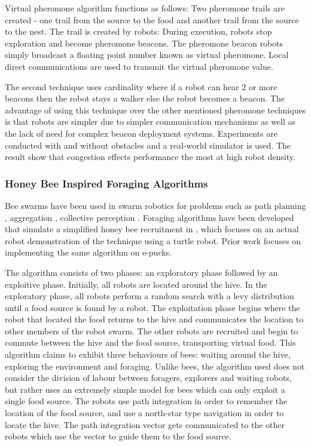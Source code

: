 Virtual pheromone algorithm functions as follows: Two pheromone trails are created - one trail from the source to the food and another trail from the source to the nest. The trail is created by robots: During execution, robots stop exploration and become pheromone beacons. The pheromone beacon robots simply broadcast a floating point number known as virtual pheromone. 
Local direct communications are used to transmit the virtual pheromone value.

The second technique uses cardinality where if a robot can hear 2 or more beacons then the robot stays a walker else the robot becomes a beacon. The advantage of using this technique over the other mentioned pheromone techniques is that robots are simpler due to simpler communication mechanisms as well as the lack of need for complex beacon deployment systems. Experiments are conducted with and without obstacles and a real-world simulator is used. The result show that congestion effects performance the most at high robot density. 

\subsubsection{Honey Bee Inspired Foraging Algorithms}
Bee swarms have been used in swarm robotics for problems such as path planning \cite{lin2009chaotic}, aggregation \cite{kernbach2009re}, collective perception \cite{schmickl2007collective}. Foraging algorithms have been developed that simulate a simplified honey bee recruitment in \cite{alers2014biologically}, which focuses on an actual robot demonstration of the technique using a turtle robot. Prior work focuses on implementing the same algorithm on e-pucks. 

The algorithm consists of two phases: an exploratory phase followed by an exploitive phase. Initially, all robots are located around the hive. In the exploratory phase, all robots perform a random search with a levy distribution until a food source is found by a robot. The exploitation phase begins where the robot that located the food returns to the hive and communicates the location to other members of the robot swarm. The other robots are recruited and begin to commute between the hive and the food source, transporting virtual food. This algorithm claims to exhibit three behaviours of bees: waiting around the hive, exploring the environment and foraging. Unlike bees, the algorithm used does not consider the division of labour between foragers, explorers and waiting robots, but rather uses an extremely simple model for bees which can only exploit a single food source. The robots use path integration in order to remember the location of the food source, and use a north-star type navigation in order to locate the hive. The path integration vector gets communicated to the other robots which use the vector to guide them to the food source. 


